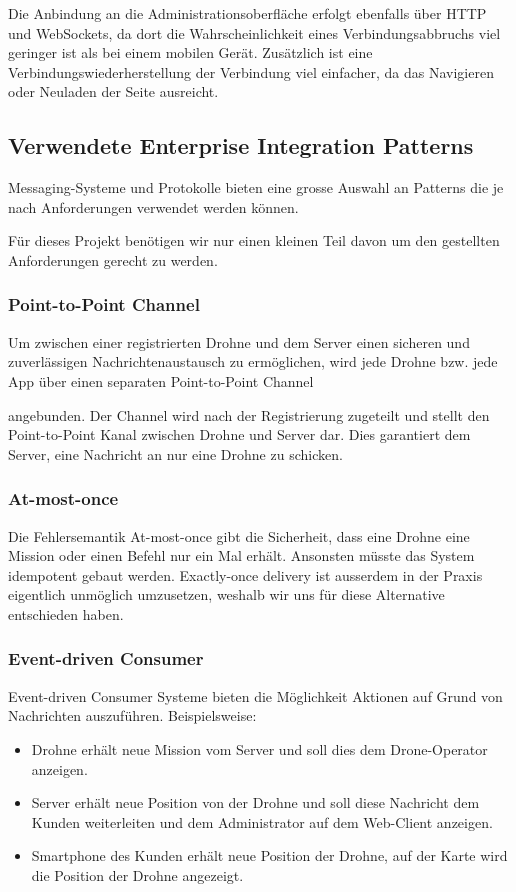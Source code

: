{Die Anbindung an die Administrationsoberfläche erfolgt ebenfalls über HTTP und WebSockets, da dort die Wahrscheinlichkeit eines Verbindungsabbruchs viel geringer ist als bei einem mobilen Gerät. Zusätzlich ist eine Verbindungswiederherstellung der Verbindung viel einfacher, da das Navigieren oder Neuladen der Seite ausreicht. \\


\subsection{Verwendete Enterprise Integration Patterns}
Messaging-Systeme und Protokolle bieten eine grosse Auswahl an Patterns die je nach Anforderungen verwendet werden können. {\cite{EIP} Für dieses Projekt benötigen wir nur einen kleinen Teil davon um den gestellten Anforderungen gerecht zu werden.
%
\subsubsection{Point-to-Point Channel}
Um zwischen einer registrierten Drohne und dem Server einen sicheren und zuverlässigen Nachrichtenaustausch zu ermöglichen, wird jede Drohne bzw. jede App über einen separaten Point-to-Point Channel	\cite[S. 103]{EIP}} angebunden. Der Channel wird nach der Registrierung zugeteilt und stellt den Point-to-Point Kanal zwischen Drohne und Server dar. Dies garantiert dem Server, eine Nachricht an nur eine Drohne zu schicken.
%
\subsubsection{At-most-once}

Die Fehlersemantik At-most-once gibt die Sicherheit, dass eine Drohne eine Mission oder einen Befehl nur ein Mal erhält. Ansonsten müsste das System idempotent gebaut werden. Exactly-once delivery ist ausserdem in der Praxis eigentlich unmöglich umzusetzen, weshalb wir uns für diese Alternative entschieden haben. 
%
\subsubsection{Event-driven Consumer}
{Event-driven Consumer \cite[S. 442]{EIP}} Systeme bieten die Möglichkeit Aktionen auf Grund von Nachrichten auszuführen. Beispielsweise:
%
\begin{itemize}
	\item Drohne erhält neue Mission vom Server und soll dies dem Drone-Operator anzeigen.
	\item Server erhält neue Position von der Drohne und soll diese Nachricht dem Kunden weiterleiten und dem Administrator auf dem Web-Client anzeigen.
	\item Smartphone des Kunden erhält neue Position der Drohne, auf der Karte wird die Position der Drohne angezeigt.
\end{itemize}

}

